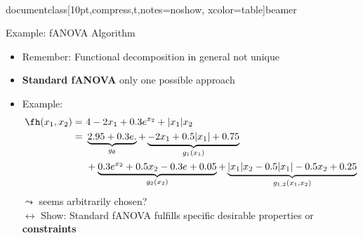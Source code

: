 \\documentclass[10pt,compress,t,notes=noshow, xcolor=table]{beamer}
\begin{document}
\begin{frame}{Example: fANOVA Algorithm}
    \begin{itemize}
        \item Remember: Functional decomposition in general not unique
        \item \textbf{Standard fANOVA} only one possible approach
        \item Example:
        \begin{align*}
            \fh(x_1, x_2) =\,&\,4 - 2x_1 + 0.3 e^{x_2} + |x_1|x_2 \\
            =\,&\,\underbrace{2.95 + 0.3 e.}_{g_\emptyset} + \underbrace{-2x_1 + 0.5|x_1| + 0.75}_{g_1(x_1)} \\
            \,&\,+ \underbrace{0.3 e^{x_2} + 0.5x_2 - 0.3e + 0.05}_{g_2(x_2)} + \underbrace{|x_1| x_2 - 0.5 |x_1| - 0.5 x_2 + 0.25}_{g_{1,2}(x_1, x_2)}
        \end{align*}
        $\leadsto$ seems arbitrarily chosen? \\
        $\longleftrightarrow$ Show: Standard fANOVA fulfills specific desirable properties or \textbf{constraints}
    \end{itemize}




    
\end{frame}
\end{document}
